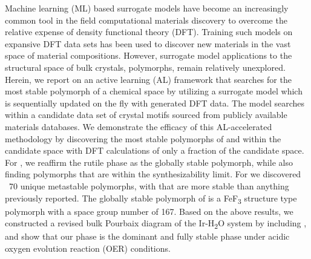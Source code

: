 %


%
Machine learning (ML) based surrogate models have become an increasingly common tool in the field computational materials discovery to overcome the relative expense of  density functional theory (DFT).
%
Training such models on expansive DFT data sets has been used to discover new materials in the vast space of material compositions.
%
However, surrogate model applications to the structural space of bulk crystals,  polymorphs, remain relatively unexplored.
%
Herein, we report on an active learning (AL) framework that searches for the most stable polymorph of a chemical space by utilizing a surrogate model which is sequentially updated on the fly with generated DFT data.
%
The model searches within a candidate data set of crystal motifs sourced from publicly available materials databases.
%
We demonstrate the efficacy of this AL-accelerated methodology by discovering the most stable polymorphs of \IrOtwo and \IrOthree within the candidate space with DFT calculations of only a fraction of the candidate space.
%
For \IrOtwo, we reaffirm the rutile phase as the globally stable polymorph, while also finding  polymorphs that are within the synthesizability limit.
%
For \IrOthree we discovered ~70 unique metastable polymorphs, with  that are more stable than anything previously reported.
%
The globally stable polymorph of \IrOthree is a FeF\textsubscript{3} structure type polymorph with a space group number of 167.
%
%
%
Based on the above results, we constructed a revised bulk Pourbaix diagram of the Ir-H\textsubscript{2}O system by including \IrOthree, and show that our \aIrOthree phase is the dominant and fully stable phase under acidic oxygen evolution reaction (OER) conditions.
